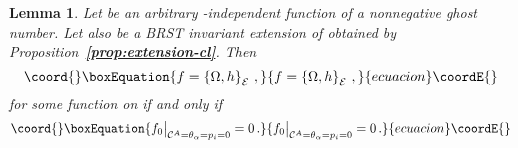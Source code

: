 \documentclass[a4paper,11pt]{amsart}
\newtheorem{lemma}[thm]{Lemma}
\numberwithin{thm}{section} %
\numberwithin{equation}{section} %
\numberwithin{figure}{section} %
\providecommand{\bref}[1]{{\bf \ref{#1}}}
\providecommand{\pb}[2]{\left\{{}#1{},{}#2{}\right\}}
\renewcommand{\:}{{\rm\, :\,}}
\def\cc{{\mathcal C}}
\def\E{{ \mathcal E}}
\begin{document}
\begin{lemma}\label{lemma:koszul-cl}
Let \coordHE{} be an arbitrary \coordHE{}-independent function of
a nonnegative  ghost number.  Let also \coordHE{} be a BRST invariant
extension of \coordHE{} obtained by Proposition~\bref{prop:extension-cl}.  Then
\begin{equation}\coord{}\boxEquation{
  f=\pb{\Omega}{h}_\E\,,
}{
  f=\pb{\Omega}{h}_\E\,,
}{ecuacion}\coordE{}\end{equation}
for some function \coordHE{} on \myHighlight{$\E$}\coordHE{} if and only if
\begin{equation}\coord{}\boxEquation{
  f_0{\bigr|}_{\cc^A=\theta_\alpha=p_i=0}=0\,.
}{
  f_0{\bigr|}_{\cc^A=\theta_\alpha=p_i=0}=0\,.
}{ecuacion}\coordE{}\end{equation}
\end{lemma}
\end{document}
